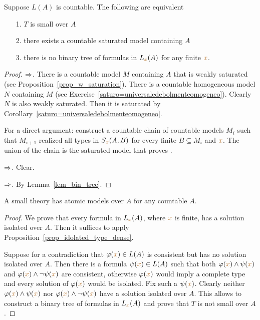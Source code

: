 \begin{proposition}\label{prop_small_equivalents}
Suppose $L(A)$ is countable.
The following are equivalent\nobreak
\begin{itemize}   
\item[1.] $T$ is small over $A$
\item[2.] there exists a countable saturated model containing $A$
\item[3.] there is no binary tree of formulas in $L_{\color{brown} x}(A)$ for any finite ${\color{brown} x}$.
\end{itemize}
\end{proposition}
\begin{proof}$\Rightarrow$. There is a countable model $M$ containing $A$ that is weakly saturated (see Proposition~\ref{prop_w_saturation}).
There is a countable homogeneous model $N$ containing $M$ (see Exercise~\ref{saturo=universaledebolmenteomogeneo}).
Clearly $N$ is also weakly saturated.
Then it is saturated by Corollary~\ref{saturo=universaledebolmenteomogeneo}.

For a direct argument: construct a countable chain of countable models $M_i$ such that $M_{i+1}$ realized all types in $S_{\color{brown} x}(A,B)$ for every finite $B\subseteq M_i$ and ${\color{brown} x}$.
The union of the chain is the saturated model that proves .


$\Rightarrow$. Clear.

$\Rightarrow$. By Lemma~\ref{lem_bin_tree}.
\end{proof}


\begin{proposition} 
A small theory has atomic models over $A$ for any countable $A$.
\end{proposition}
\begin{proof}
We prove that every formula in $L_{\color{brown} x}(A)$, where ${\color{brown} x}$ is finite, has a solution isolated over $A$.
Then it suffices to apply Proposition~\ref{prop_idolated_type_dense}.

Suppose for a contradiction that $\varphi({\color{brown} x})\in L(A)$ is consistent but has no solution isolated over $A$.
Then there is a formula $\psi({\color{brown} x})\in L(A)$ such that both $\varphi({\color{brown} x})\wedge\psi({\color{brown} x})$ and $\varphi({\color{brown} x})\wedge\neg\psi({\color{brown} x})$ are consistent, otherwise $\varphi({\color{brown} x})$ would imply a complete type and every solution of $\varphi({\color{brown} x})$ would be isolated.
Fix such a $\psi({\color{brown} x})$.
Clearly neither $\varphi({\color{brown} x})\wedge\psi({\color{brown} x})$ nor $\varphi({\color{brown} x})\wedge\neg\psi({\color{brown} x})$ have a solution isolated over $A$.
This allows to construct a binary tree of formulas in $L_{\color{brown} x}(A)$ and prove that $T$ is not small over $A$.
\end{proof}

